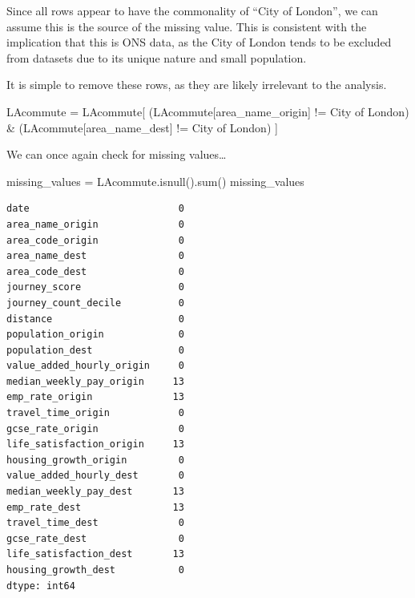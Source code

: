 \documentclass[
  number]{elsarticle}
\newenvironment{Shaded}{\begin{snugshade}}{\end{snugshade}}
\newcommand{\BuiltInTok}[1]{\textcolor[rgb]{0.00,0.23,0.31}{#1}}
\newcommand{\NormalTok}[1]{\textcolor[rgb]{0.00,0.23,0.31}{#1}}
\newcommand{\OperatorTok}[1]{\textcolor[rgb]{0.37,0.37,0.37}{#1}}
\newcommand{\StringTok}[1]{\textcolor[rgb]{0.13,0.47,0.30}{#1}}
\begin{document}
Since all rows appear to have the commonality of ``City of London'', we
can assume this is the source of the missing value. This is consistent
with the implication that this is ONS data, as the City of London tends
to be excluded from datasets due to its unique nature and small
population.

It is simple to remove these rows, as they are likely irrelevant to the
analysis.

\begin{Shaded}
\begin{Highlighting}[]
\NormalTok{LAcommute }\OperatorTok{=}\NormalTok{ LAcommute[}
\NormalTok{    (LAcommute[}\StringTok{\textquotesingle{}area\_name\_origin\textquotesingle{}}\NormalTok{] }\OperatorTok{!=} \StringTok{\textquotesingle{}City of London\textquotesingle{}}\NormalTok{) }\OperatorTok{\&}
\NormalTok{    (LAcommute[}\StringTok{\textquotesingle{}area\_name\_dest\textquotesingle{}}\NormalTok{] }\OperatorTok{!=} \StringTok{\textquotesingle{}City of London\textquotesingle{}}\NormalTok{)}
\NormalTok{]}
\end{Highlighting}
\end{Shaded}

We can once again check for missing values\ldots{}

\begin{Shaded}
\begin{Highlighting}[]
\NormalTok{missing\_values }\OperatorTok{=}\NormalTok{ LAcommute.isnull().}\BuiltInTok{sum}\NormalTok{()}
\NormalTok{missing\_values}
\end{Highlighting}
\end{Shaded}

\begin{verbatim}
date                          0
area_name_origin              0
area_code_origin              0
area_name_dest                0
area_code_dest                0
journey_score                 0
journey_count_decile          0
distance                      0
population_origin             0
population_dest               0
value_added_hourly_origin     0
median_weekly_pay_origin     13
emp_rate_origin              13
travel_time_origin            0
gcse_rate_origin              0
life_satisfaction_origin     13
housing_growth_origin         0
value_added_hourly_dest       0
median_weekly_pay_dest       13
emp_rate_dest                13
travel_time_dest              0
gcse_rate_dest                0
life_satisfaction_dest       13
housing_growth_dest           0
dtype: int64
\end{verbatim}
\end{document}
